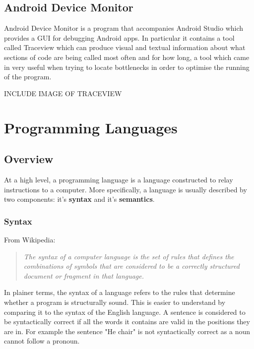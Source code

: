 \documentclass[ %
                    author={Jonathan Rankin},
                supervisor={Dr. David May, Dr. Ian Holyer},
                    degree={MEng},
                     title={CodeTouch},
                  subtitle={A Revolutionary Way To Program Real Code On Touch Screen Devices},
                      type={enterprise},
                      year={2015 } ]{dissertation}
\begin{document}
\subsection{Android Device Monitor}
Android Device Monitor is a program that accompanies Android Studio which provides a GUI for debugging Android apps. In particular it contains a tool called Traceview which can produce visual and textual information about what sections of code are being called most often and for how long, a tool which came in very useful when trying to locate bottlenecks in order to optimise the running of the program.

INCLUDE IMAGE OF TRACEVIEW

\section{Programming Languages}


\subsection{Overview}
At a high level, a programming language is a language constructed to relay instructions to a computer. More specifically, a language is usually described by two components: it's \textbf{syntax} and it's \textbf{semantics}.

\subsubsection{Syntax}
From Wikipedia:

\begin{quote}

\textit{The syntax of a computer language is the set of rules that defines the combinations of symbols that are considered to be a correctly structured document or fragment in that language.}
\end{quote}

In plainer terms, the syntax of a language refers to the rules that determine whether a program is structurally sound. This is easier to understand by comparing it to the syntax of the English language. A sentence is considered to be syntactically correct if all the words it contains are valid in the positions they are in. For example the sentence "He chair" is not syntactically correct as a noun cannot follow a pronoun.
\end{document}
